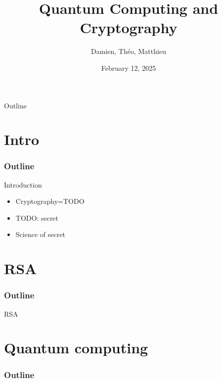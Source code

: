 \documentclass{beamer}
\title{Quantum Computing and Cryptography}
\author{Damien, Théo, Matthieu}
\institute{University}
\date{February 12, 2025}
\begin{document}
\begin{frame}
\maketitle
\end{frame}

\begin{frame}{Outline}
\tableofcontents
\end{frame}

\section{Intro}
\begin{frame}
  \frametitle{Outline}
  \tableofcontents[currentsection]
\end{frame}

\begin{frame}{Introduction}
\begin{linenumbers}
	\begin{itemize}
		\item Cryptography=TODO
		\item TODO: secret
		\item<2->[$\rightarrow$] Science of secret
	\end{itemize}
\end{linenumbers}
\end{frame}

\section{RSA}
\begin{frame}
  \frametitle{Outline}
  \tableofcontents[currentsection]
\end{frame}

\begin{frame}{RSA}
\begin{linenumbers}

\end{linenumbers}
\end{frame}

\section{Quantum computing}
\begin{frame}
  \frametitle{Outline}
  \tableofcontents[currentsection]
\end{frame}
\end{document}
